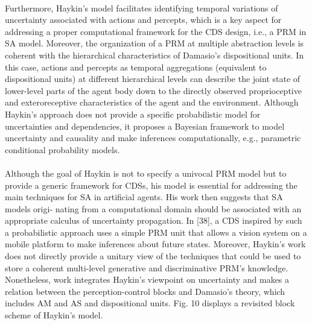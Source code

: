 \documentclass{article}
\begin{document}
		\paragraph{}Furthermore, Haykin’s model facilitates identifying temporal variations of uncertainty associated with actions and
		percepts, which is a key aspect for addressing a proper
		computational framework for the CDS design, i.e., a PRM
		in \cite{regazzoni-2020-multi-sensorial-generative-and-descriptive-self-awareness-models-for-autonomous-systems} SA model. Moreover, the organization of a PRM at
		multiple abstraction levels is coherent with the hierarchical
		characteristics of Damasio’s dispositional units. In this case,
		actions and percepts as temporal aggregations (equivalent to
		dispositional units) at different hierarchical levels can describe
		the joint state of lower-level parts of the agent body down
		to the directly observed proprioceptive and exteroreceptive
		characteristics of the agent and the environment. Although
		Haykin’s approach does not provide a specific probabilistic model for uncertainties and dependencies, it proposes a
		Bayesian framework to model uncertainty and causality and
		make inferences computationally, e.g., parametric conditional
		probability models.
		
		\paragraph{}Although the goal of Haykin is not to specify a univocal
		PRM model but to provide a generic framework for CDSs, his
		model is essential for addressing the main techniques for SA in
		artificial agents. His work then suggests that SA models origi-
		nating from a computational domain should be associated with
		an appropriate calculus of uncertainty propagation. In [38], a
		CDS inspired by such a probabilistic approach uses a simple
		PRM unit that allows a vision system on a mobile platform to
		make inferences about future states. Moreover, Haykin’s work
		does not directly provide a unitary view of the techniques
		that could be used to store a coherent multi-level generative
		and discriminative PRM’s knowledge. Nonetheless, \cite{regazzoni-2020-multi-sensorial-generative-and-descriptive-self-awareness-models-for-autonomous-systems} work
		integrates Haykin’s viewpoint on uncertainty and makes a
		relation between the perception-control blocks and Damasio’s
		theory, which includes AM and AS and dispositional units.
		\cite{regazzoni-2020-multi-sensorial-generative-and-descriptive-self-awareness-models-for-autonomous-systems}Fig. 10 displays a revisited block scheme of Haykin’s model.
		
\end{document}

